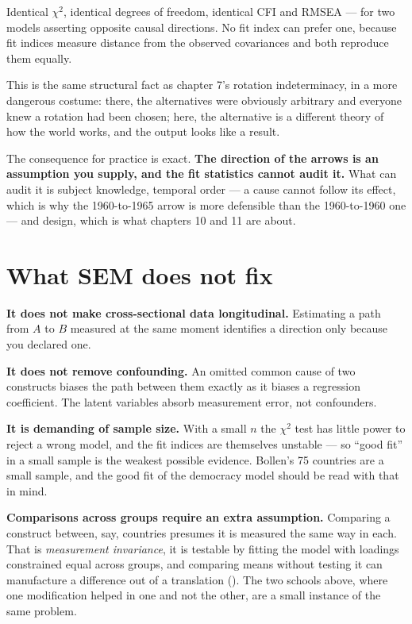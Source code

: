 \documentclass[
  letterpaper,
  10pt,
  twoside,
  openright,
  numbers=noenddot,
  chapterprefix=true]{scrbook}
\begin{document}
Identical \(\chi^2\), identical degrees of freedom, identical CFI and
RMSEA --- for two models asserting opposite causal directions. No fit
index can prefer one, because fit indices measure distance from the
observed covariances and both reproduce them equally.

This is the same structural fact as chapter 7's rotation indeterminacy,
in a more dangerous costume: there, the alternatives were obviously
arbitrary and everyone knew a rotation had been chosen; here, the
alternative is a different theory of how the world works, and the output
looks like a result.

The consequence for practice is exact. \textbf{The direction of the
arrows is an assumption you supply, and the fit statistics cannot audit
it.} What can audit it is subject knowledge, temporal order --- a cause
cannot follow its effect, which is why the 1960-to-1965 arrow is more
defensible than the 1960-to-1960 one --- and design, which is what
chapters 10 and 11 are about.

\section{What SEM does not fix}\label{what-sem-does-not-fix}

\textbf{It does not make cross-sectional data longitudinal.} Estimating
a path from \(A\) to \(B\) measured at the same moment identifies a
direction only because you declared one.

\textbf{It does not remove confounding.} An omitted common cause of two
constructs biases the path between them exactly as it biases a
regression coefficient. The latent variables absorb measurement error,
not confounders.

\textbf{It is demanding of sample size.} With a small \(n\) the
\(\chi^2\) test has little power to reject a wrong model, and the fit
indices are themselves unstable --- so ``good fit'' in a small sample is
the weakest possible evidence. Bollen's 75 countries are a small sample,
and the good fit of the democracy model should be read with that in
mind.

\textbf{Comparisons across groups require an extra assumption.}
Comparing a construct between, say, countries presumes it is measured
the same way in each. That is \emph{measurement invariance}, it is
testable by fitting the model with loadings constrained equal across
groups, and comparing means without testing it can manufacture a
difference out of a translation (). The two schools above, where one modification helped in
one and not the other, are a small instance of the same problem.
\end{document}
